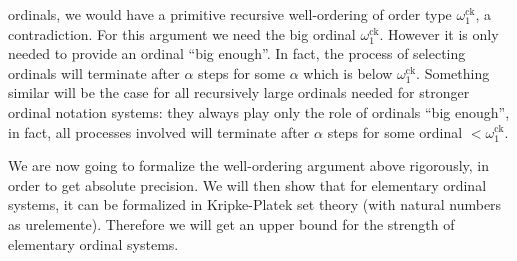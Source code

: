 \documentclass[10pt]{article}
\def\T{\mathrm{T}}
\def\ck{\mathrm{ck}}
\begin{document}
ordinals, we would have a primitive recursive well-ordering
of order type $\omega_1^{\ck}$, a contradiction. For this argument
we need the  big ordinal $\omega_1^\ck$.
However it is only needed to provide an ordinal ``big enough''. In
fact, the process of selecting ordinals will terminate after $\alpha$
steps for some $\alpha$ which is below $\omega_1^\ck$. Something similar
will be the case for all recursively large ordinals needed for 
stronger ordinal notation systems: they always play only the role
of ordinals ``big enough'', in fact, all processes involved will terminate
after $\alpha$ steps for some ordinal $< \omega_1^\ck$.\par 
We are now going to formalize the well-ordering argument above rigorously,
in order to get absolute precision. We will
then show that for elementary ordinal systems, it can be formalized
in Kripke-Platek set theory (with natural numbers as urelemente). 
Therefore we will get an upper bound for the strength of elementary
ordinal systems.
%
%
%
%
%
%
\end{document}
